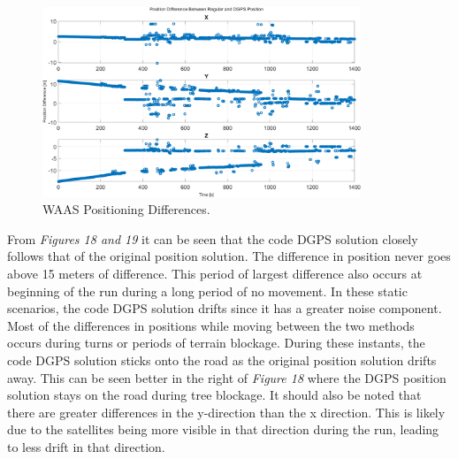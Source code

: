 \documentclass[11pt]{article}
\begin{document}
\begin{enumerate}[label=\textbf{\arabic*.}]
\begin{figure}[H]
        \centering
        \includegraphics[width=0.85\textwidth]{p4_diff.png}
        \caption{WAAS Positioning Differences.}
      \end{figure}
      From \emph{Figures 18 and 19} it can be seen that the code DGPS solution closely 
      follows that of the original position solution. The difference in position never 
      goes above 15 meters of difference. This period of largest difference also occurs at 
      beginning of the run during a long period of no movement. In these static scenarios, 
      the code DGPS solution drifts since it has a greater noise component. Most of the 
      differences in positions while moving  between the two methods occurs during turns or 
      periods of terrain blockage. During these instants, the code DGPS solution sticks onto 
      the road as the original position solution drifts away. This can be seen better in 
      the right of \emph{Figure 18} where the DGPS position solution stays on the road during 
      tree blockage. It should also be noted that there are greater differences in the 
      y-direction than the x direction. This is likely due to the satellites being more 
      visible in that direction during the run, leading to less drift in that direction.

\end{enumerate}
\end{document}
